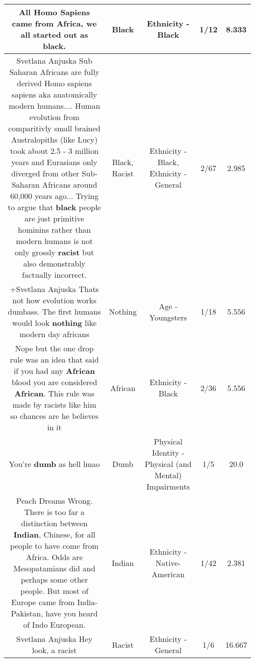 \documentclass[11pt]{article}
\newlength\mylength
\begin{document}
\begin{center}
\begin{longtable}{|C{.65\mylength}|C{.30\mylength}|C{.12\mylength}|C{.12\mylength}|C{.12\mylength}|}
  \small All Homo Sapiens came from Africa, we all started out as \textbf{black}.\normalsize   & Black & Ethnicity - Black & 1/12 & 8.333 \\  \hline
  \small Svetlana Anjuska Sub Saharan Africans are fully derived Homo sapiens sapiens aka anatomically modern humans.... Human evolution from comparitivly small brained Australopiths (like Lucy) took about 2.5 - 3 million years and Eurasians only diverged from other Sub-Saharan Africans around 60,000 years ago... Trying to argue that \textbf{black} people are just primitive hominins rather than modern humans is not only grossly \textbf{racist} but also demonstrably factually incorrect.\normalsize   & Black, Racist & Ethnicity - Black, Ethnicity - General & 2/67 & 2.985 \\  \hline
  \small +Svetlana Anjuska Thats not how evolution works dumbass. The first humans would look \textbf{nothing} like modern day africans\normalsize   & Nothing & Age - Youngsters & 1/18 & 5.556 \\  \hline
  \small Nope but the one drop rule was an idea that said if you had any \textbf{African} blood you are considered \textbf{African}. This rule was made by racists like him so chances are he believes in it\normalsize   & African & Ethnicity - Black & 2/36 & 5.556 \\  \hline
  \small You're \textbf{dumb} as hell lmao\normalsize   & Dumb & Physical Identity - Physical (and Mental) Impairments & 1/5 & 20.0 \\  \hline
  \small Peach Dreams Wrong. There is too far a distinction between \textbf{Indian}, Chinese, for all people to have come from Africa. Odds are Mesopatamians did and perhaps some other people. But most of Europe came from India-Pakistan, have you heard of Indo European.\normalsize   & Indian & Ethnicity - Native-American & 1/42 & 2.381 \\  \hline
  \small Svetlana Anjuska Hey look, a racist\normalsize   & Racist & Ethnicity - General & 1/6 & 16.667 \\  \hline

\end{longtable}
\end{center}
\end{document}
